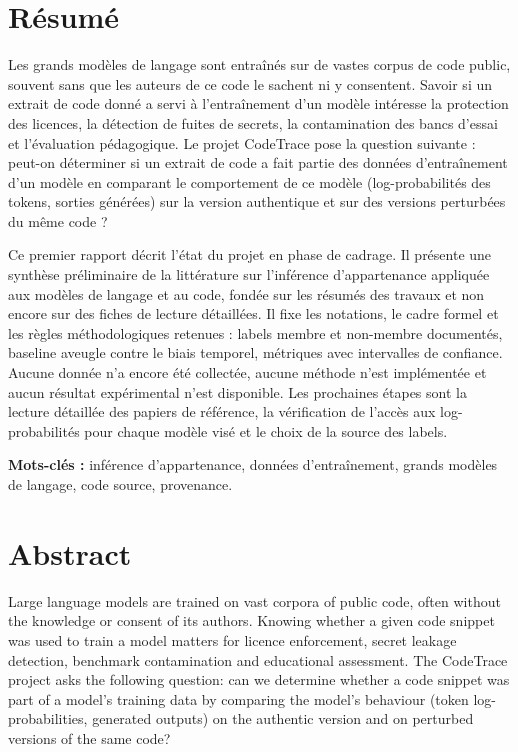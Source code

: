 \section*{Résumé}
Les grands modèles de langage sont entraînés sur de vastes corpus de code public, souvent sans que les auteurs de ce code le sachent ni y consentent. Savoir si un extrait de code donné a servi à l'entraînement d'un modèle intéresse la protection des licences, la détection de fuites de secrets, la contamination des bancs d'essai et l'évaluation pédagogique. Le projet CodeTrace pose la question suivante : peut-on déterminer si un extrait de code a fait partie des données d'entraînement d'un modèle en comparant le comportement de ce modèle (log-probabilités des tokens, sorties générées) sur la version authentique et sur des versions perturbées du même code ?

Ce premier rapport décrit l'état du projet en phase de cadrage. Il présente une synthèse préliminaire de la littérature sur l'inférence d'appartenance appliquée aux modèles de langage et au code, fondée sur les résumés des travaux et non encore sur des fiches de lecture détaillées. Il fixe les notations, le cadre formel et les règles méthodologiques retenues : labels membre et non-membre documentés, baseline aveugle contre le biais temporel, métriques avec intervalles de confiance. Aucune donnée n'a encore été collectée, aucune méthode n'est implémentée et aucun résultat expérimental n'est disponible. Les prochaines étapes sont la lecture détaillée des papiers de référence, la vérification de l'accès aux log-probabilités pour chaque modèle visé et le choix de la source des labels.

\noindent\textbf{Mots-clés :} inférence d'appartenance, données d'entraînement, grands modèles de langage, code source, provenance.

\section*{Abstract}
Large language models are trained on vast corpora of public code, often without the knowledge or consent of its authors. Knowing whether a given code snippet was used to train a model matters for licence enforcement, secret leakage detection, benchmark contamination and educational assessment. The CodeTrace project asks the following question: can we determine whether a code snippet was part of a model's training data by comparing the model's behaviour (token log-probabilities, generated outputs) on the authentic version and on perturbed versions of the same code?

